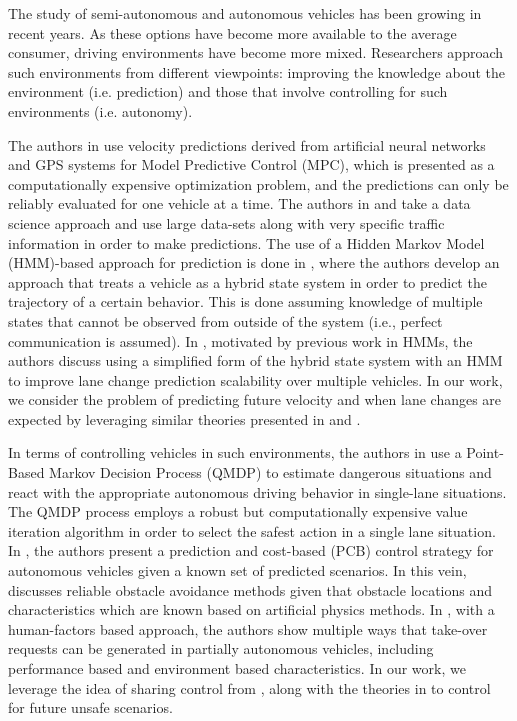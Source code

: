 \documentclass[letterpaper, 10 pt, conference]{ieeeconf}  %
\begin{document}
The study of semi-autonomous and autonomous vehicles has been growing in recent years. As these options have become more available to the average consumer, driving environments have become more mixed. Researchers approach such environments from different viewpoints: improving the knowledge about the environment (i.e. prediction) and those that involve controlling for such environments (i.e. autonomy).

The authors in \cite{mpc} use velocity predictions derived from artificial neural networks and GPS systems for Model Predictive Control (MPC), which is presented as a computationally expensive optimization problem, and the predictions can only be reliably evaluated for one vehicle at a time. The authors in \cite{velnn} and \cite{veldatadriv} take a data science approach and use large data-sets along with very specific traffic information in order to make predictions. The use of a Hidden Markov Model (HMM)-based approach for prediction is done in \cite{lanhmm}, where the authors develop an approach that treats a vehicle as a hybrid state system in order to predict the trajectory of a certain behavior. This is done  assuming knowledge of multiple states that cannot be observed from outside of the system (i.e., perfect communication is assumed). In \cite{woohmm}, motivated by previous work in HMMs, the authors discuss using a simplified form of the hybrid state system with an HMM to improve lane change prediction scalability over multiple vehicles. In our work, we consider the problem of predicting future velocity and when lane changes are expected by leveraging similar theories presented in \cite{mpc} and \cite{woohmm}.

In terms of controlling vehicles in such environments, the authors in \cite{qmdp} use a Point-Based Markov Decision Process (QMDP) to estimate dangerous situations and react with the appropriate autonomous driving behavior in single-lane situations. The QMDP process employs a robust but computationally expensive value iteration algorithm in order to select the safest action in a single lane situation. In \cite{predcost}, the authors present a prediction and cost-based (PCB) control strategy for autonomous vehicles given a known set of predicted scenarios. In this vein, \cite{vfh*} discusses reliable obstacle avoidance methods given that obstacle locations and characteristics which are known based on artificial physics methods. In \cite{takeover}, with a human-factors based approach, the authors show multiple ways that take-over requests can be generated in partially autonomous vehicles, including performance based and environment based characteristics. In our work, we leverage the idea of sharing control from \cite{takeover}, along with the theories in \cite{vfh*} to control for future unsafe scenarios.
\end{document}
